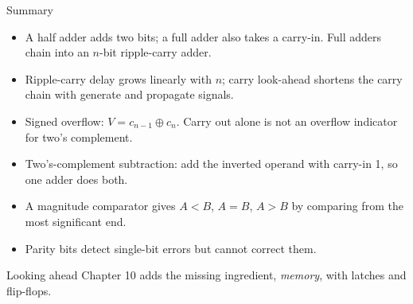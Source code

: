 \documentclass[9pt,aspectratio=169,xcolor=table]{beamer}
\begin{document}
\begin{frame}{Summary}
  \begin{itemize}\itemsep3pt\small
    \item A \alert{half adder} adds two bits; a \alert{full adder} also takes a carry-in. Full adders chain into an $n$-bit \alert{ripple-carry adder}.
    \item Ripple-carry delay grows linearly with $n$; \alert{carry look-ahead} shortens the carry chain with generate and propagate signals.
    \item \alert{Signed overflow}: $V = c_{n-1} \oplus c_n$. Carry out alone is not an overflow indicator for two's complement.
    \item \alert{Two's-complement subtraction}: add the inverted operand with carry-in 1, so one adder does both.
    \item A \alert{magnitude comparator} gives $A<B$, $A=B$, $A>B$ by comparing from the most significant end.
    \item Parity bits detect single-bit errors but cannot correct them.
  \end{itemize}
  \begin{block}{Looking ahead}
    Chapter 10 adds the missing ingredient, \emph{memory}, with latches and flip-flops.
  \end{block}
\end{frame}
\end{document}
